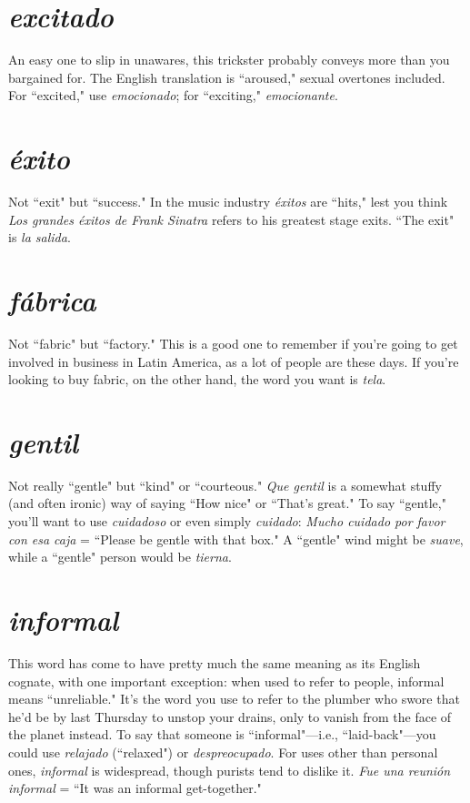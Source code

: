 \section{\emph{excitado}}

An easy one to slip in unawares, this trickster
probably conveys more than you bargained for. The English translation
is ``aroused," sexual overtones included. For ``excited," use \emph{emocionado}; for ``exciting," \emph{emocionante}.

\section{\emph{éxito}}

Not ``exit" but ``success." In the music industry \emph{éxitos}
are ``hits," lest you think \emph{Los grandes éxitos de Frank Sinatra} refers to
his greatest stage exits. ``The exit" is \emph{la salida}.

\section{\emph{fábrica}}

Not ``fabric" but ``factory." This is a good one to remember if you're going to get involved in business in Latin America, as
a lot of people are these days. If you're looking to buy fabric, on the
other hand, the word you want is \emph{tela}.

\section{\emph{gentil}}

Not really ``gentle" but ``kind" or ``courteous." \emph{Que
gentil} is a somewhat stuffy (and often ironic) way of saying ``How
nice" or ``That's great." To say ``gentle," you'll want to use \emph{cuidadoso}
or even simply \emph{cuidado}: \emph{Mucho cuidado por favor con esa caja} =
``Please be gentle with that box." A ``gentle" wind might be \emph{suave},
while a ``gentle" person would be \emph{tierna}.

\section{\emph{informal}}

This word has come to have pretty much the
same meaning as its English cognate, with one important exception:
when used to refer to people, informal means ``unreliable." It's the
word you use to refer to the plumber who swore that he'd be by last
Thursday to unstop your drains, only to vanish from the face of the
planet instead. To say that someone is ``informal"---i.e., ``laid-back"---you could use \emph{relajado} (``relaxed") or \emph{despreocupado}. For uses other
than personal ones, \emph{informal} is widespread, though purists tend to dislike it. \emph{Fue una reunión informal} = ``It was an informal get-together."

